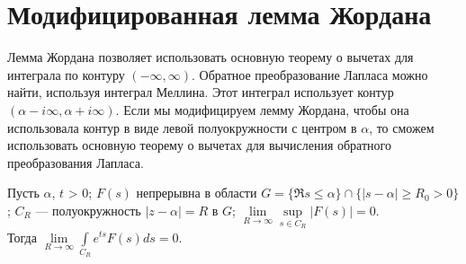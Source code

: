 \section {Модифицированная лемма Жордана}
Лемма Жордана позволяет использовать основную теорему о вычетах для интеграла по контуру $(-\infty, \infty)$.
Обратное преобразование Лапласа можно найти, используя интеграл Меллина. Этот интеграл использует контур $(\alpha - i\infty, \alpha + i\infty)$.
Если мы модифицируем лемму Жордана, чтобы она использовала контур в виде левой полуокружности с центром в $\alpha$, то сможем использовать основную теорему о вычетах для вычисления обратного преобразования Лапласа.
%
\begin{Th*} $ $ \\
    Пусть $\alpha$, $t$ > 0; 
    $F(s)$ непрерывна в области $G = \{\Re s \le  \alpha \} \cap \{ |s-\alpha| \ge  R_0 > 0 \}$;
	$C_R$ --- полуокружность $|z-\alpha| = R$ в $G$;
	$\lim\limits_{R \to \infty} \sup\limits_{s \in C_R} |F(s)| = 0$. \\
    Тогда $\lim\limits_{R \to \infty} \int\limits_{C_R} e^{ts} F(s)ds = 0$.
\end{Th*}

